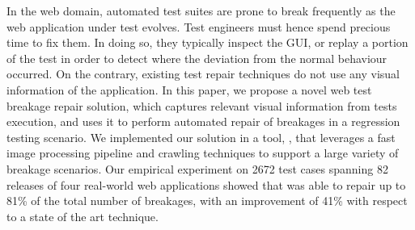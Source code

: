 In the web domain, automated test suites are prone to break frequently as the web application under test evolves. Test engineers must hence spend precious time to fix them. In doing so, they typically inspect the GUI, or replay a portion of the test in order to detect where the deviation from the normal behaviour occurred. 
On the contrary, existing test repair techniques do not use any visual information of the application.
In this paper, we propose a novel web test breakage repair solution, which captures relevant visual information from tests execution, and uses it to perform automated repair of breakages in a regression testing scenario. We implemented our solution in a tool, \tool, that leverages a fast image processing pipeline and crawling techniques to support a large variety of breakage scenarios. Our empirical experiment on 2672 test cases spanning 82 releases of four real-world web applications showed that \tool was able to repair up to 81\% of the total number of breakages, with an improvement of 41\% with respect to a state of the art technique. %